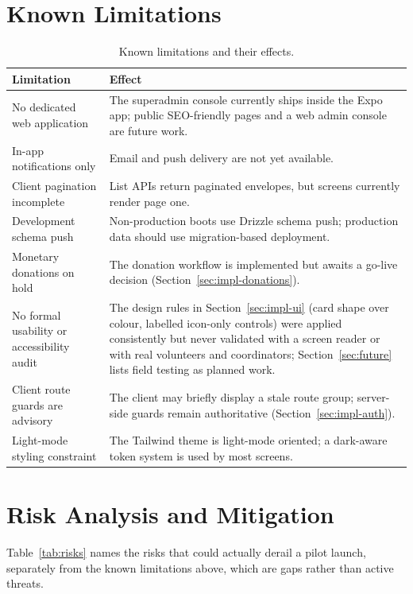 \section{Known Limitations}
\label{sec:limitations}

\begin{table}[H]\centering
\caption{Known limitations and their effects.}
\label{tab:limitations}
\begin{tabularx}{\textwidth}{|p{}|X|}
\hline
\textbf{Limitation} & \textbf{Effect}\\\hline
No dedicated web application & The superadmin console currently ships inside the Expo app; public SEO-friendly pages and a web admin console are future work.\\\hline
In-app notifications only & Email and push delivery are not yet available.\\\hline
Client pagination incomplete & List APIs return paginated envelopes, but screens currently render page one.\\\hline
Development schema push & Non-production boots use Drizzle schema push; production data should use migration-based deployment.\\\hline
Monetary donations on hold & The donation workflow is implemented but awaits a go-live decision (Section~\ref{sec:impl-donations}).\\\hline
No formal usability or accessibility audit & The design rules in Section~\ref{sec:impl-ui} (card shape over colour, labelled icon-only controls) were applied consistently but never validated with a screen reader or with real volunteers and coordinators; Section~\ref{sec:future} lists field testing as planned work.\\\hline
Client route guards are advisory & The client may briefly display a stale route group; server-side guards remain authoritative (Section~\ref{sec:impl-auth}).\\\hline
Light-mode styling constraint & The Tailwind theme is light-mode oriented; a dark-aware token system is used by most screens.\\\hline
\end{tabularx}
\end{table}

\section{Risk Analysis and Mitigation}
\label{sec:risks}
Table~\ref{tab:risks} names the risks that could actually derail a pilot launch, separately from the known limitations above, which are gaps rather than active threats.

